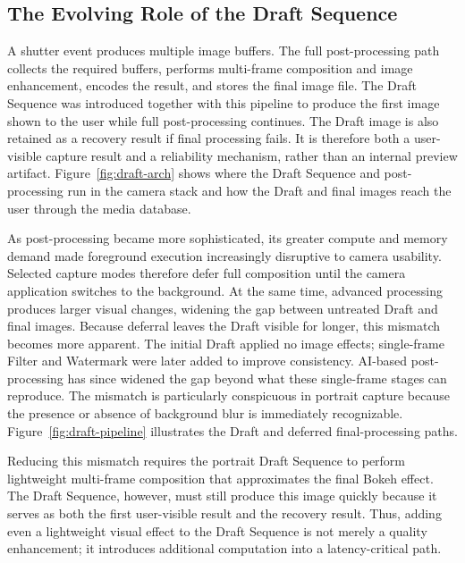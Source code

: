\subsection{The Evolving Role of the Draft Sequence}
\label{sec:draft-background}

A shutter event produces multiple image buffers. The full post-processing path
collects the required buffers, performs multi-frame composition and image
enhancement, encodes the result, and stores the final image file. The Draft
Sequence was introduced together with this pipeline to produce the first image
shown to the user while full post-processing continues. The Draft image is also
retained as a recovery result if final processing fails. It is therefore both a
user-visible capture result and a reliability mechanism, rather than an
internal preview artifact. Figure~\ref{fig:draft-arch} shows where the Draft
Sequence and post-processing run in the camera stack and how the Draft and
final images reach the user through the media database.

As post-processing became more sophisticated, its greater compute and memory
demand made foreground execution increasingly disruptive to camera usability.
Selected capture modes therefore defer full composition until the camera
application switches to the background. At the same time, advanced processing
produces larger visual changes, widening the gap between untreated Draft and
final images. Because deferral leaves the Draft visible for longer, this
mismatch becomes more apparent. The initial Draft applied no image effects;
single-frame Filter and Watermark were later added to improve consistency.
AI-based post-processing has since widened the gap beyond what these
single-frame stages can reproduce. The mismatch is particularly conspicuous in
portrait capture because the presence or absence of background blur is
immediately recognizable. Figure~\ref{fig:draft-pipeline} illustrates the Draft
and deferred final-processing paths.

Reducing this mismatch requires the portrait Draft Sequence to perform
lightweight multi-frame composition that approximates the final Bokeh effect.
The Draft Sequence, however, must still produce this image quickly because it
serves as both the first user-visible result and the recovery result. Thus,
adding even a lightweight visual effect to the Draft Sequence is not merely a
quality enhancement; it introduces additional computation into a
latency-critical path.


